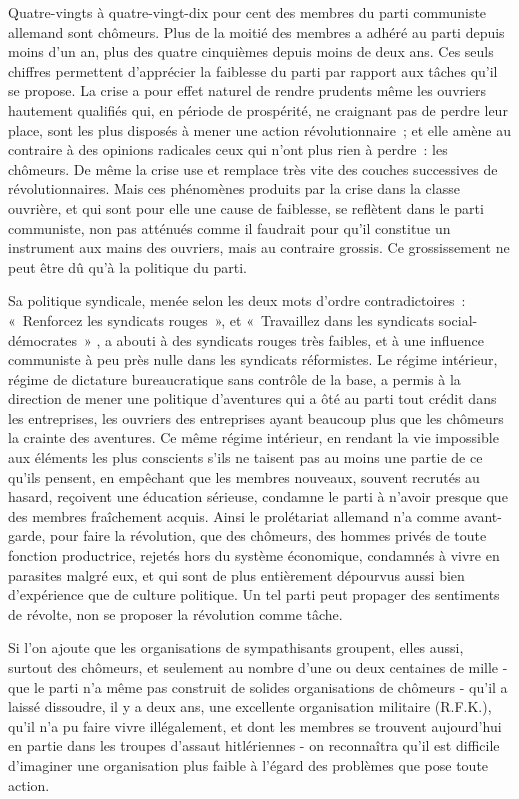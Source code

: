 \documentclass[french,twoside]{book} %
\begin{document}
Quatre-vingts à quatre-vingt-dix pour cent des membres du parti communiste allemand sont chômeurs. Plus de la moitié des membres a adhéré au parti depuis moins d'un an, plus des quatre cinquièmes depuis moins de deux ans. Ces seuls chiffres permettent d'apprécier la faiblesse du parti par rapport aux tâches qu'il se propose. La crise a pour effet naturel de rendre prudents même les ouvriers hautement qualifiés qui, en période de prospérité, ne craignant pas de perdre leur place, sont les plus disposés à mener une action révolutionnaire ; et elle amène au contraire à des opinions radicales ceux qui n'ont plus rien à perdre : les chômeurs. De même la crise use et remplace très vite des couches successives de révolutionnaires. Mais ces phénomènes produits par la crise dans la classe ouvrière, et qui sont pour elle une cause de faiblesse, se reflètent dans le parti communiste, non pas atténués comme il faudrait pour qu'il constitue un instrument aux mains des ouvriers, mais au contraire grossis. Ce grossissement ne peut être dû qu'à la politique du parti.\par
Sa politique syndicale, menée selon les deux mots d'ordre contradictoires : « Renforcez les syndicats rouges », et « Travaillez dans les syndicats social-démocrates » , a abouti à des syndicats rouges très faibles, et à une influence communiste à peu près nulle dans les syndicats réformistes. Le régime intérieur, régime de dictature bureaucratique sans contrôle de la base, a permis à la direction de mener une politique d'aventures qui a ôté au parti tout crédit dans les entreprises, les ouvriers des entreprises ayant beaucoup plus que les chômeurs la crainte des aventures. Ce même régime intérieur, en rendant la vie impossible aux éléments les plus conscients s'ils ne taisent pas au moins une partie de ce qu'ils pensent, en empêchant que les membres nouveaux, souvent recrutés au hasard, reçoivent une éducation sérieuse, condamne le parti à n'avoir presque que des membres fraîchement acquis. Ainsi le prolé­tariat allemand n'a comme avant-garde, pour faire la révolution, que des chômeurs, des hommes privés de toute fonction productrice, rejetés hors du système économique, condamnés à vivre en parasites malgré eux, et qui sont de plus entièrement dépourvus aussi bien d'expérience que de culture politi­que. Un tel parti peut propager des sentiments de révolte, non se proposer la révolution comme tâche.\par
Si l'on ajoute que les organisations de sympathisants groupent, elles aussi, surtout des chômeurs, et seulement au nombre d'une ou deux centaines de mille - que le parti n'a même pas construit de solides organisations de chô­meurs - qu'il a laissé dissoudre, il y a deux ans, une excellente organisation militaire (R.F.K.), qu'il n'a pu faire vivre illégalement, et dont les membres se trouvent aujourd'hui en partie dans les troupes d'assaut hitlériennes - on reconnaîtra qu'il est difficile d'imaginer une organisation plus faible à l'égard des problèmes que pose toute action.\par
\end{document}
